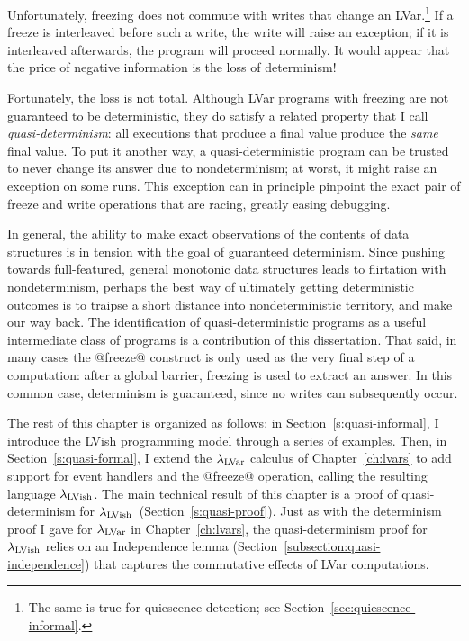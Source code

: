 Unfortunately, freezing does not commute with writes that change an
LVar.\footnote{The same is true for quiescence detection; see
  Section~\ref{sec:quiescence-informal}.}  If a freeze is interleaved
before such a write, the write will raise an exception; if it is
interleaved afterwards, the program will proceed normally.  It would
appear that the price of negative information is the loss of
determinism!

Fortunately, the loss is not total.  Although LVar programs with
freezing are not guaranteed to be deterministic, they do satisfy a
related property that I call \emph{quasi-determinism}: all executions
that produce a final value produce the \emph{same} final value.  To
put it another way, a quasi-deterministic program can be trusted to
never change its answer due to nondeterminism; at worst, it might
raise an exception on some runs.  This exception can in principle
pinpoint the exact pair of freeze and write operations that are
racing, greatly easing debugging.

In general, the ability to make exact observations of the contents of
data structures is in tension with the goal of guaranteed determinism.
Since pushing towards full-featured, general monotonic data structures
leads to flirtation with nondeterminism, perhaps the best way of
ultimately getting deterministic outcomes is to traipse a short
distance into nondeterministic territory, and make our way back.  The
identification of quasi-deterministic programs as a useful
intermediate class of programs is a contribution of this dissertation.
That said, in many cases the @freeze@ construct is only used as the
very final step of a computation: after a global barrier, freezing is
used to extract an answer.  In this common case, determinism is
guaranteed, since no writes can subsequently occur.

The rest of this chapter is organized as follows: in
Section~\ref{s:quasi-informal}, I introduce the LVish programming
model through a series of examples.  Then, in
Section~\ref{s:quasi-formal}, I extend the $\lambda_{\textrm{LVar}}$ calculus of
Chapter~\ref{ch:lvars} to add support for event handlers and the
@freeze@ operation, calling the resulting language $\lambda_{\textrm{LVish}}$.
The main technical result of this chapter is a proof of
quasi-determinism for
$\lambda_{\textrm{LVish}}$~(Section~\ref{s:quasi-proof}). Just as with the
determinism proof I gave for $\lambda_{\textrm{LVar}}$ in Chapter~\ref{ch:lvars},
the quasi-determinism proof for $\lambda_{\textrm{LVish}}$ relies on an
Independence lemma (Section~\ref{subsection:quasi-independence}) that
captures the commutative effects of LVar computations.
